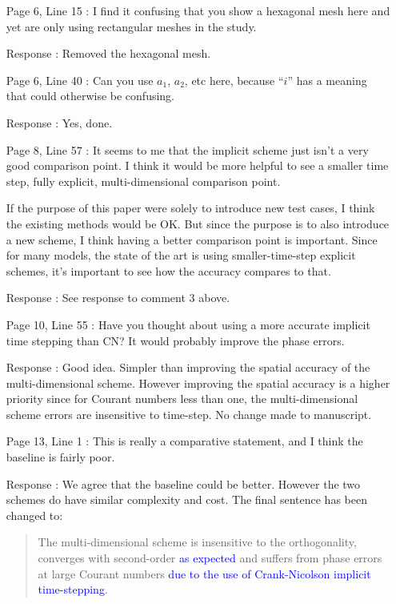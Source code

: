 \documentclass[12pt]{article}
\begin{document}
\begin{enumerate}
\item [Page 6, Line 15]: I find it confusing that you show a hexagonal mesh here and yet are only using rectangular meshes in the study.

\item [Response]: Removed the hexagonal mesh.

\item [Page 6, Line 40]: Can you use $a_1$, $a_2$, etc here, because ``$i$'' has a meaning that could otherwise be confusing.

\item [Response]: Yes, done.

\item [Page 8, Line 57]: It seems to me that the implicit scheme just isn't a very good comparison point. I think it would be more helpful to see a smaller time step, fully explicit, multi-dimensional comparison point.

If the purpose of this paper were solely to introduce new test cases, I think the existing methods would be OK. But since the purpose is to also introduce a new scheme, I think having a better comparison point is important. Since for many models, the state of the art is using smaller-time-step explicit schemes, it's important to see how the accuracy compares to that.

\item [Response]: See response to comment 3 above. 

\item [Page 10, Line 55]: Have you thought about using a more accurate implicit time stepping than CN? It would probably improve the phase errors.

\item [Response]: Good idea. Simpler than improving the spatial accuracy of the multi-dimensional scheme. However improving the spatial accuracy is a higher priority since for Courant numbers less than one, the multi-dimensional scheme errors are insensitive to time-step. No change made to manuscript.

\item [Page 13, Line 1]: This is really a comparative statement, and I think the baseline is fairly poor.

\item [Response]: We agree that the baseline could be better. However the two schemes do have similar complexity and cost. The final sentence has been changed to:
\begin{quote}
The multi-dimensional scheme is insensitive to the orthogonality, converges with second-order \textcolor{blue}{as expected} and suffers from phase errors at large Courant numbers \textcolor{blue}{due to the use of Crank-Nicolson implicit time-stepping}.
\end{quote}


\end{enumerate}
\end{document}
